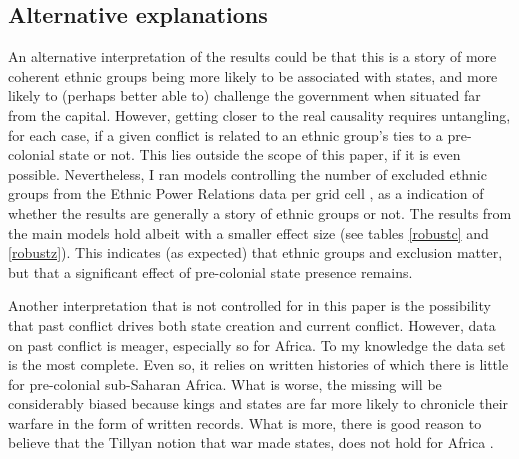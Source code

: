 

\subsection{Alternative explanations} \label{Alternative explanations}

An alternative interpretation of the results could be that this is a story of
more coherent ethnic groups being more likely to be associated with states, and
more likely to (perhaps better able to) challenge the government when situated
far from the capital. However, getting closer to the real causality requires
untangling, for each case, if a given conflict is related to an ethnic group's
ties to a pre-colonial state or not. This lies outside the scope of this paper,
if it is even possible. Nevertheless, I ran models controlling the number of
excluded ethnic groups from the Ethnic Power Relations data per grid cell
\citep{Vogt2015}, as a indication of whether the results are generally a story of
ethnic groups or not. The results from the main models hold albeit with a smaller
effect size (see tables \ref{robustc} and \ref{robustz}). This indicates (as
expected) that ethnic groups and exclusion matter, but that a significant effect
of pre-colonial state presence remains.

Another interpretation that is not controlled for in this paper is the
possibility that past conflict drives both state creation and current conflict.
However, data on past conflict is meager, especially so for Africa. To my
knowledge the \citet{Brecke1999} data set is the most complete. Even so, it
relies on written histories of which there is little for pre-colonial
sub-Saharan Africa. What is worse, the missing will be considerably biased
because kings and states are far more likely to chronicle their warfare in the
form of written records. What is more, there is good reason to believe that the
Tillyan notion that war made states, does not hold for Africa
\citep{Dincecco_2019}. 

